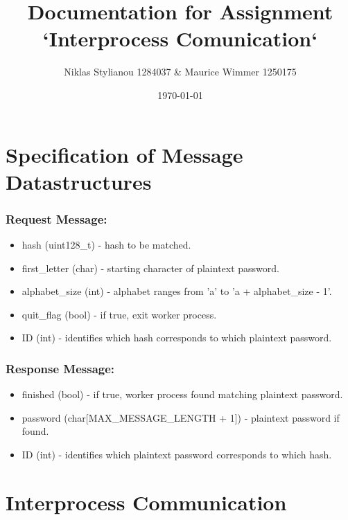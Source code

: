 \documentclass{article}
\title{Documentation for Assignment `Interprocess Comunication`}
\author{Niklas Stylianou 1284037 \& Maurice Wimmer 1250175}
\date{\today}
\begin{document}
\maketitle

\section{Specification of Message Datastructures}%
\label{sec:specification_of_message_datastructures}

\subsubsection*{Request Message:}%

\begin{itemize}
    \item hash (uint128\_t) - hash to be matched.
    \item first\_letter (char) - starting character of plaintext password.
    \item alphabet\_size (int) - alphabet ranges from 'a' to 'a + alphabet\_size - 1'.
    \item quit\_flag (bool) - if true, exit worker process.
    \item ID (int) - identifies which hash corresponds to which plaintext password.
\end{itemize}

\subsubsection*{Response Message:}%

\begin{itemize}
    \item finished (bool) - if true, worker process found matching plaintext password.
    \item password (char[MAX\_MESSAGE\_LENGTH + 1]) - plaintext password if found.
    \item ID (int) - identifies which plaintext password corresponds to which hash.
\end{itemize}

\section{Interprocess Communication}%
\label{sec:interprocess_communication}
\end{document}
